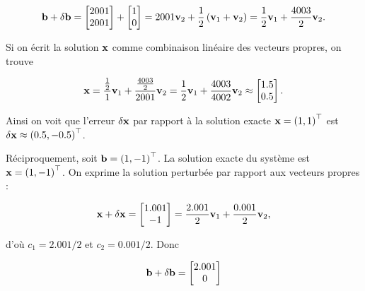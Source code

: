 \begin{enumerate}[label=\alph*)]
  \begin{equation*}
    \mathbf{b} + \delta \mathbf{b}
    =   \begin{bmatrix}
          2001 \\
          2001
        \end{bmatrix} 
        +
        \begin{bmatrix}
          1 \\
          0
        \end{bmatrix} 
    = 2001 \mathbf{v}_{2} + \dfrac{1}{2} \left(\mathbf{v}_{1} + \mathbf{v}_{2}\right)
    = \dfrac{1}{2} \mathbf{v}_{1} + \dfrac{4003}{2} \mathbf{v}_{2}.
  \end{equation*}
  
  Si on écrit la solution $\mathbf{x}$ comme combinaison linéaire des vecteurs propres, on trouve
  
  \begin{equation*}
    \mathbf{x}
    = \dfrac{\frac{1}{2}}{1} \mathbf{v}_{1} + \dfrac{\frac{4003}{2}}{2001} \mathbf{v}_{2}
    = \dfrac{1}{2} \mathbf{v}_{1} + \dfrac{4003}{4002} \mathbf{v}_{2}
    \approx 
    \begin{bmatrix}
      1.5 \\
      0.5
    \end{bmatrix}. 
  \end{equation*}
  
  Ainsi on voit que l'erreur $\delta \mathbf{x}$ par rapport à la solution exacte $\mathbf{x} = \left(1, 1\right)^{\top}$ est $\delta \mathbf{x} \approx \left(0.5, -0.5\right)^{\top}$.
  
  Réciproquement, soit $\mathbf{b} = \left(1, -1\right)^{\top}$. La solution exacte du système est $\mathbf{x} = \left(1, -1\right)^{\top}$.
  On exprime la solution perturbée par rapport aux vecteurs propres :
  
  \begin{equation*}
    \mathbf{x} + \delta \mathbf{x}
    =   \begin{bmatrix}
          1.001 \\
          -1
        \end{bmatrix} 
    = \dfrac{2.001}{2} \mathbf{v}_{1} + \dfrac{0.001}{2} \mathbf{v}_{2},
  \end{equation*}
  
  d'où $c_{1} = 2.001/2$ et $c_{2} = 0.001/2$. Donc 
  
  \begin{equation*}
    \mathbf{b} + \delta \mathbf{b}
    =   \begin{bmatrix}
          2.001 \\
          0
        \end{bmatrix} 
  \end{equation*}
  

\end{enumerate}
